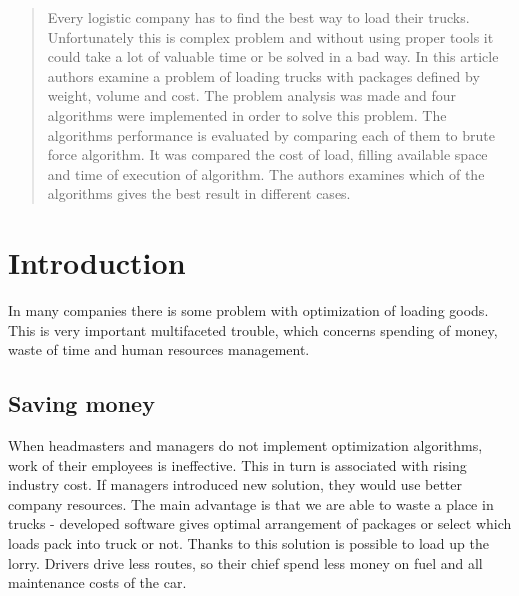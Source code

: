 \documentclass[conference,compsoc]{IEEEtran}
\begin{document}




\maketitle

\begin{abstract}
Every logistic company has to find the best way to load their trucks. Unfortunately this is complex problem and without using proper tools it could take a lot of valuable time or be solved in a bad way. In this article authors  examine a problem of loading trucks with packages defined by weight, volume and cost. The problem analysis was made and four algorithms were implemented in order to solve this problem. The algorithms performance is evaluated by comparing each of them to brute force algorithm. It was compared the cost of load, filling available space and time of execution of algorithm. The authors examines which of the algorithms gives the best result in different cases.
\end{abstract}





%
\IEEEpeerreviewmaketitle



\section{Introduction}
In many companies there is some problem with optimization of loading goods. This is very important multifaceted trouble, which concerns spending of money, waste of time and human resources management.

\subsection{Saving money}
When headmasters and managers do not implement optimization algorithms, work of their employees is ineffective. This in turn is associated with rising industry cost. If managers introduced new solution, they would use better company resources. %
The main advantage is that we are able to waste a place in trucks - developed software gives optimal arrangement of packages or select which loads pack into truck or not. Thanks to this solution is possible  to load up the lorry. Drivers drive less routes, so their chief spend less money on fuel and all maintenance costs of the car.
\end{document}
